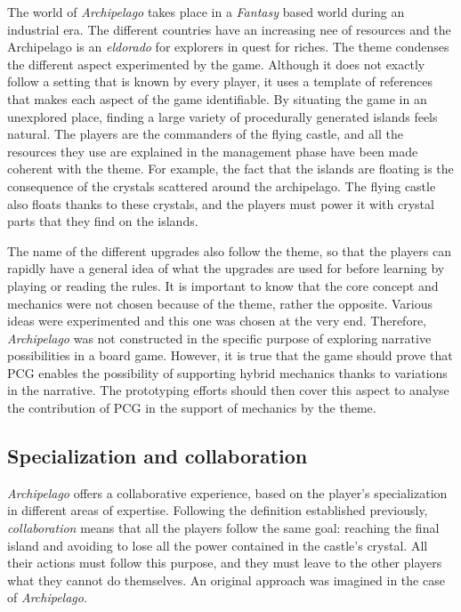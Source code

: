 The world of \textit{Archipelago} takes place in a \textit{Fantasy} based world during an industrial era. The different countries have an increasing nee of resources and the Archipelago is an \textit{eldorado} for explorers in quest for riches. The theme condenses the different aspect experimented by the game. Although it does not exactly follow a setting that is known by every player, it uses a template of references that makes each aspect of the game identifiable. By situating the game in an unexplored place, finding a large variety of procedurally generated islands feels natural. The players are the commanders of the flying castle, and all the resources they use are explained in the management phase have been made coherent with the theme. For example, the fact that the islands are floating is the consequence of the crystals scattered around the archipelago. The flying castle also floats thanks to these crystals, and the players must power it with crystal parts that they find on the islands. 

The name of the different upgrades also follow the theme, so that the players can rapidly have a general idea of what the upgrades are used for before learning by playing or reading the rules. It is important to know that the core concept and mechanics were not chosen because of the theme, rather the opposite. Various ideas were experimented and this one was chosen at the very end. Therefore, \textit{Archipelago} was not constructed in the specific purpose of exploring narrative possibilities in a board game. However, it is true that the game should prove that PCG enables the possibility of supporting hybrid mechanics thanks to variations in the narrative. The prototyping efforts should then cover this aspect to analyse the contribution of PCG in the support of mechanics by the theme.
\subsection{Specialization and collaboration}
\textit{Archipelago} offers a collaborative experience, based on the player's specialization in different areas of expertise. Following the definition established previously, \textit{collaboration} means that all the players follow the same goal: reaching the final island and avoiding to lose all the power contained in the castle's crystal. All their actions must follow this purpose, and they must leave to the other players what they cannot do themselves. An original approach was imagined in the case of \textit{Archipelago}.

